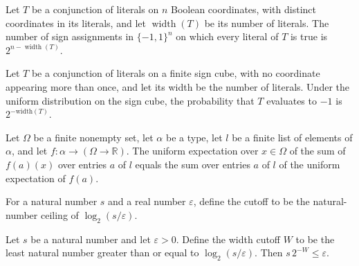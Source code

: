 \begin{theorem}
\label{FABL.DNFTerm.card_eval_neg_one}
\leanok
{}
Let $T$ be a conjunction of literals on $n$ Boolean coordinates, with distinct
coordinates in its literals, and let $\operatorname{width}(T)$ be its number of
literals. The number of sign assignments in $\{-1,1\}^n$ on which every literal of $T$
is true is $2^{n-\operatorname{width}(T)}$.
\end{theorem}

\begin{theorem}
\label{FABL.uniformProbability_DNFTerm_eval_neg_one}
\leanok
{}
Let $T$ be a conjunction of literals on a finite sign cube, with no coordinate appearing
more than once, and let its width be the number of literals. Under the uniform
distribution on the sign cube, the probability that $T$ evaluates to $-1$ is
$2^{-\mathrm{width}(T)}$.
\end{theorem}

\begin{theorem}
\label{FABL.expect_sum_list_map}
\leanok
{}
Let $\Omega$ be a finite nonempty set, let $\alpha$ be a type, let $l$ be a finite list
of elements of $\alpha$, and let $f\colon\alpha\to(\Omega\to\mathbb{R})$. The uniform
expectation over $x\in\Omega$ of the sum of $f(a)(x)$ over entries $a$ of $l$ equals the
sum over entries $a$ of $l$ of the uniform expectation of $f(a)$.
\end{theorem}

\begin{definition}
\label{FABL.dnfWidthTruncationCutoff}
\leanok
For a natural number $s$ and a real number $\varepsilon$, define the cutoff to be the
natural-number ceiling of $\log_2(s/\varepsilon)$.
\end{definition}

\begin{theorem}
\label{FABL.mul_inv_two_pow_dnfWidthTruncationCutoff_le}
\leanok
{}
Let $s$ be a natural number and let $\varepsilon>0$. Define the width cutoff $W$ to be
the least natural number greater than or equal to $\log_2(s/\varepsilon)$. Then
$s\,2^{-W}\le\varepsilon$.
\end{theorem}

